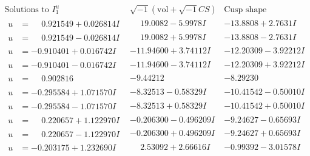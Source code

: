 \documentclass[1p]{elsarticle_modified}
\theoremstyle{definition}
\newcommand{\I}{\sqrt{-1}}
\begin{document}
$$\begin{array}{c|c|c}  
\text{Solutions to }I^u_{1}& \I (\text{vol} + \sqrt{-1}CS) & \text{Cusp shape}\\
 \hline 
\begin{aligned}
u &= \phantom{-}0.921549 + 0.026814 I\end{aligned}
 & \phantom{-}19.0082 - 5.9978 I & -13.8808 + 2.7631 I \\ \hline\begin{aligned}
u &= \phantom{-}0.921549 - 0.026814 I\end{aligned}
 & \phantom{-}19.0082 + 5.9978 I & -13.8808 - 2.7631 I \\ \hline\begin{aligned}
u &= -0.910401 + 0.016742 I\end{aligned}
 & -11.94600 + 3.74112 I & -12.20309 - 3.92212 I \\ \hline\begin{aligned}
u &= -0.910401 - 0.016742 I\end{aligned}
 & -11.94600 - 3.74112 I & -12.20309 + 3.92212 I \\ \hline\begin{aligned}
u &= \phantom{-}0.902816\phantom{ +0.000000I}\end{aligned}
 & -9.44212\phantom{ +0.000000I} & -8.29230\phantom{ +0.000000I} \\ \hline\begin{aligned}
u &= -0.295584 + 1.071570 I\end{aligned}
 & -8.32513 - 0.58329 I & -10.41542 - 0.50010 I \\ \hline\begin{aligned}
u &= -0.295584 - 1.071570 I\end{aligned}
 & -8.32513 + 0.58329 I & -10.41542 + 0.50010 I \\ \hline\begin{aligned}
u &= \phantom{-}0.220657 + 1.122970 I\end{aligned}
 & -0.206300 - 0.496209 I & -9.24627 - 0.65693 I \\ \hline\begin{aligned}
u &= \phantom{-}0.220657 - 1.122970 I\end{aligned}
 & -0.206300 + 0.496209 I & -9.24627 + 0.65693 I \\ \hline\begin{aligned}
u &= -0.203175 + 1.232690 I\end{aligned}
 & \phantom{-}2.53092 + 2.66616 I & -0.99392 - 3.01578 I \\ \hline\begin{aligned}

\end{aligned}
\end{array}$$
\end{document}
